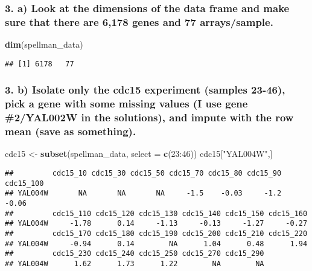\documentclass[]{article}
\newenvironment{Shaded}{\begin{snugshade}}{\end{snugshade}}
\newcommand{\KeywordTok}[1]{\textcolor[rgb]{0.13,0.29,0.53}{\textbf{{#1}}}}
\newcommand{\DataTypeTok}[1]{\textcolor[rgb]{0.13,0.29,0.53}{{#1}}}
\newcommand{\DecValTok}[1]{\textcolor[rgb]{0.00,0.00,0.81}{{#1}}}
\newcommand{\StringTok}[1]{\textcolor[rgb]{0.31,0.60,0.02}{{#1}}}
\newcommand{\NormalTok}[1]{{#1}}
\begin{document}
\subsubsection{3. a) Look at the dimensions of the data frame and make
sure that there are 6,178 genes and 77
arrays/sample.}\label{a-look-at-the-dimensions-of-the-data-frame-and-make-sure-that-there-are-6178-genes-and-77-arrayssample.}

\begin{Shaded}
\begin{Highlighting}[]
\KeywordTok{dim}\NormalTok{(spellman_data)}
\end{Highlighting}
\end{Shaded}

\begin{verbatim}
## [1] 6178   77
\end{verbatim}

\newpage

\subsubsection{3. b) Isolate only the cdc15 experiment (samples 23-46),
pick a gene with some missing values (I use gene \#2/YAL002W in the
solutions), and impute with the row mean (save as
something).}\label{b-isolate-only-the-cdc15-experiment-samples-23-46-pick-a-gene-with-some-missing-values-i-use-gene-2yal002w-in-the-solutions-and-impute-with-the-row-mean-save-as-something.}

\begin{Shaded}
\begin{Highlighting}[]
\NormalTok{cdc15 <-}\StringTok{ }\KeywordTok{subset}\NormalTok{(spellman_data, }\DataTypeTok{select =} \KeywordTok{c}\NormalTok{(}\DecValTok{23}\NormalTok{:}\DecValTok{46}\NormalTok{))}
\NormalTok{cdc15[}\StringTok{"YAL004W"}\NormalTok{,]}
\end{Highlighting}
\end{Shaded}

\begin{verbatim}
##         cdc15_10 cdc15_30 cdc15_50 cdc15_70 cdc15_80 cdc15_90 cdc15_100
## YAL004W       NA       NA       NA     -1.5    -0.03     -1.2     -0.06
##         cdc15_110 cdc15_120 cdc15_130 cdc15_140 cdc15_150 cdc15_160
## YAL004W     -1.78      0.14     -1.13     -0.13     -1.27     -0.27
##         cdc15_170 cdc15_180 cdc15_190 cdc15_200 cdc15_210 cdc15_220
## YAL004W     -0.94      0.14        NA      1.04      0.48      1.94
##         cdc15_230 cdc15_240 cdc15_250 cdc15_270 cdc15_290
## YAL004W      1.62      1.73      1.22        NA        NA
\end{verbatim}
\end{document}

